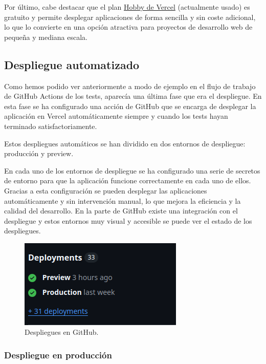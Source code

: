 Por último, cabe destacar que el plan \href{https://vercel.com/docs/accounts/plans/hobby}{Hobby de Vercel} (actualmente usado) es gratuito y permite desplegar aplicaciones de forma sencilla y sin coste adicional, lo que lo convierte en una opción atractiva para proyectos de desarrollo web de pequeña y mediana escala.

\subsection{Despliegue automatizado}

Como hemos podido ver anteriormente a modo de ejemplo en el flujo de trabajo de GitHub Actions de los tests, aparecía una última fase que era el despliegue. En esta fase se ha configurado una acción de GitHub que se encarga de desplegar la aplicación en Vercel automáticamente siempre y cuando los tests hayan terminado satisfactoriamente.

Estos despliegues automáticos se han dividido en dos entornos de despliegue: producción y preview.

En cada uno de los entornos de despliegue se ha configurado una serie de secretos de entorno para que la aplicación funcione correctamente en cada uno de ellos. Gracias a esta configuración se pueden desplegar las aplicaciones automáticamente y sin intervención manual, lo que mejora la eficiencia y la calidad del desarrollo. En la parte de GitHub existe una integración con el despliegue y estos entornos muy visual y accesible se puede ver el estado de los despliegues.

\begin{figure}[H]
    \caption{Despliegues en GitHub.}
    \centering
    \vspace*{0.5cm}
    \includegraphics[scale=0.5]{figuras/despliegues.png}
\end{figure}

\subsubsection{Despliegue en producción}

